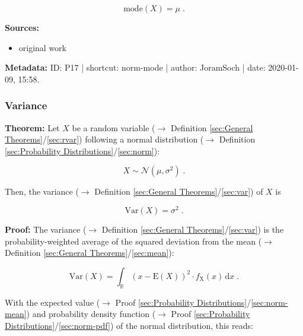 \documentclass[a4paper,12pt,twoside]{book}
\begin{document}
\begin{equation} \label{eq:norm-mode-norm-mode-qed}
\mathrm{mode}(X) = \mu \; .
\end{equation}


\vspace{1em}
\textbf{Sources:}
\begin{itemize}
\item original work\end{itemize}


\vspace{1em}
\textbf{Metadata:} ID: P17 | shortcut: norm-mode | author: JoramSoch | date: 2020-01-09, 15:58.
\vspace{1em}



\subsubsection[\textbf{Variance}]{Variance} \label{sec:norm-var}
\setcounter{equation}{0}

\textbf{Theorem:} Let $X$ be a random variable ($\rightarrow$ Definition \ref{sec:General Theorems}/\ref{sec:rvar}) following a normal distribution ($\rightarrow$ Definition \ref{sec:Probability Distributions}/\ref{sec:norm}):

\begin{equation} \label{eq:norm-var-norm}
X \sim \mathcal{N}(\mu, \sigma^2) \; .
\end{equation}

Then, the variance ($\rightarrow$ Definition \ref{sec:General Theorems}/\ref{sec:var}) of $X$ is

\begin{equation} \label{eq:norm-var-norm-var}
\mathrm{Var}(X) = \sigma^2 \; .
\end{equation}


\vspace{1em}
\textbf{Proof:} The variance ($\rightarrow$ Definition \ref{sec:General Theorems}/\ref{sec:var}) is the probability-weighted average of the squared deviation from the mean ($\rightarrow$ Definition \ref{sec:General Theorems}/\ref{sec:mean}):

\begin{equation} \label{eq:norm-var-var}
\mathrm{Var}(X) = \int_{\mathbb{R}} (x - \mathrm{E}(X))^2 \cdot f_\mathrm{X}(x) \, \mathrm{d}x \; .
\end{equation}

With the expected value ($\rightarrow$ Proof \ref{sec:Probability Distributions}/\ref{sec:norm-mean}) and probability density function ($\rightarrow$ Proof \ref{sec:Probability Distributions}/\ref{sec:norm-pdf}) of the normal distribution, this reads:
\end{document}
